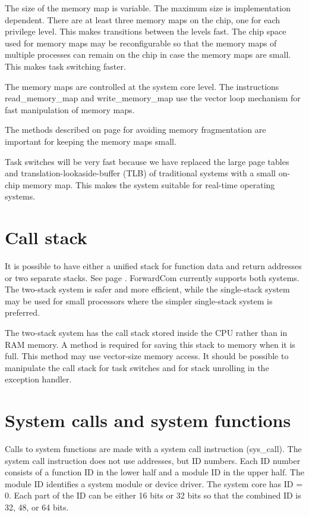 \documentclass[forwardcom.tex]{subfiles}
\begin{document}
The size of the memory map is variable. The maximum size is implementation dependent. There are at least three memory maps on the chip, one for each privilege level. This makes transitions between the levels fast. The chip space used for memory maps may be reconfigurable so that the memory maps of multiple processes can remain on the chip in case the memory maps are small. This makes task switching faster.
\vspace{2mm}

The memory maps are controlled at the system core level. The instructions read\_memory\_map and write\_memory\_map use the vector loop mechanism for fast manipulation of memory maps.
\vspace{2mm}

The methods described on page \pageref{memoryManagement} for avoiding memory fragmentation are important for keeping the memory maps small. 
\vspace{2mm}

Task switches will be very fast because we have replaced the large page tables and translation-lookaside-buffer (TLB) of traditional systems with a small on-chip memory map. This makes the system suitable for real-time operating systems.

\section{Call stack}
It is possible to have either a unified stack for function data and return addresses or two separate stacks. See page \pageref{callStackAlternatives}. ForwardCom currently supports both systems. The two-stack system is safer and more efficient, while the single-stack system may be used for small processors where the simpler single-stack system is preferred.
\vspace{2mm}

The two-stack system has the call stack stored inside the CPU rather than in RAM memory. A method is required for saving this stack to memory when it is full. This method may use vector-size memory access. It should be possible to manipulate the call stack for task switches and for stack unrolling in the exception handler.

\section{System calls and system functions} \label{systemCallIDSystem}
Calls to system functions are made with a system call instruction (sys\_call). The system call instruction does not use addresses, but ID numbers. Each ID number consists of a function ID in the lower half and a module ID in the upper half. The module ID identifies a system module or device driver. The system core has ID = 0. Each part of the ID can be either 16 bits or 32 bits so that the combined ID is 32, 48, or 64 bits. 
\vspace{2mm}
\end{document}

